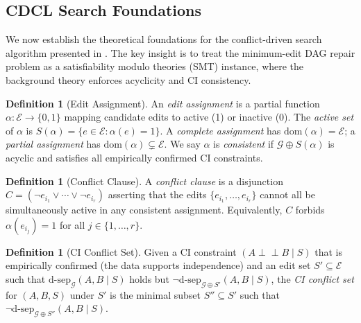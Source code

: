 \documentclass[11pt,a4paper]{article}
\theoremstyle{definition}
\newtheorem{definition}[theorem]{Definition}
\theoremstyle{remark}
\newcommand{\CI}{\perp\!\!\!\perp}
\newcommand{\DAG}{\mathcal{G}}
\newcommand{\dsep}{\mathrm{d\text{-}sep}}
\begin{document}
\subsection{CDCL Search Foundations}\label{sec:cdcl_theory}

We now establish the theoretical foundations for the conflict-driven search
algorithm presented in . The key insight is to treat the
minimum-edit DAG repair problem as a satisfiability modulo theories (SMT)
instance, where the background theory enforces acyclicity and CI consistency.

\begin{definition}[Edit Assignment]\label{def:edit_assignment}
An \emph{edit assignment} is a partial function $\alpha : \mathcal{E} \to \{0, 1\}$
mapping candidate edits to active (1) or inactive (0). The \emph{active set} of
$\alpha$ is $S(\alpha) = \{e \in \mathcal{E} : \alpha(e) = 1\}$.
A \emph{complete assignment} has $\mathrm{dom}(\alpha) = \mathcal{E}$; a
\emph{partial assignment} has $\mathrm{dom}(\alpha) \subsetneq \mathcal{E}$.
We say $\alpha$ is \emph{consistent} if $\DAG \oplus S(\alpha)$ is acyclic and
satisfies all empirically confirmed CI constraints.
\end{definition}

\begin{definition}[Conflict Clause]\label{def:conflict_clause}
A \emph{conflict clause} is a disjunction $C = (\neg e_{i_1} \vee \cdots \vee
\neg e_{i_r})$ asserting that the edits $\{e_{i_1}, \ldots, e_{i_r}\}$ cannot
all be simultaneously active in any consistent assignment. Equivalently,
$C$ forbids $\alpha(e_{i_j}) = 1$ for all $j \in \{1, \ldots, r\}$.
\end{definition}

\begin{definition}[CI Conflict Set]\label{def:ci_conflict}
Given a CI constraint $(A \CI B \mid S)$ that is empirically confirmed (the data
supports independence) and an edit set $S' \subseteq \mathcal{E}$ such that
$\dsep_{\DAG}(A, B \mid S)$ holds but $\neg\dsep_{\DAG \oplus S'}(A, B \mid S)$,
the \emph{CI conflict set} for $(A, B, S)$ under $S'$ is the minimal subset
$S'' \subseteq S'$ such that $\neg\dsep_{\DAG \oplus S''}(A, B \mid S)$.
\end{definition}
\end{document}
